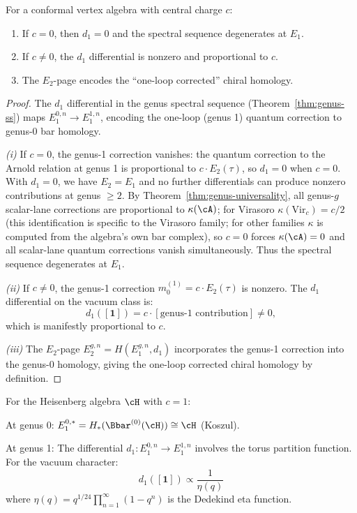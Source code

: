 \begin{proposition}
\label{prop:central-charge-d1}
For a conformal vertex algebra with central charge $c$:
\begin{enumerate}[label=(\roman*)]
\item If $c = 0$, then $d_1 = 0$ and the spectral sequence degenerates at $E_1$.
\item If $c \neq 0$, the $d_1$ differential is nonzero and proportional to $c$.
\item The $E_2$-page encodes the ``one-loop corrected'' chiral homology.
\end{enumerate}
\end{proposition}

\begin{proof}
The $d_1$ differential in the genus spectral sequence (Theorem~\ref{thm:genus-ss}) maps $E_1^{0,n} \to E_1^{1,n}$, encoding the one-loop (genus 1) quantum correction to genus-0 bar homology.

\emph{(i)} If $c = 0$, the genus-1 correction vanishes: the quantum correction to the Arnold relation at genus 1 is proportional to $c \cdot E_2(\tau)$, so $d_1 = 0$ when $c = 0$. With $d_1 = 0$, we have $E_2 = E_1$ and no further differentials can produce nonzero contributions at genus $\geq 2$. By Theorem~\ref{thm:genus-universality}, all genus-$g$ scalar-lane corrections are proportional to $\kappa(\cA)$; for Virasoro $\kappa(\mathrm{Vir}_c) = c/2$ (this identification is specific to the Virasoro family; for other families $\kappa$ is computed from the algebra's own bar complex), so $c = 0$ forces $\kappa(\cA) = 0$ and all scalar-lane quantum corrections vanish simultaneously. Thus the spectral sequence degenerates at $E_1$.

\emph{(ii)} If $c \neq 0$, the genus-1 correction $m_0^{(1)} = c \cdot E_2(\tau)$ is nonzero. The $d_1$ differential on the vacuum class is:
\[
d_1([\mathbf{1}]) = c \cdot [\text{genus-1 contribution}] \neq 0,
\]
which is manifestly proportional to $c$.

\emph{(iii)} The $E_2$-page $E_2^{g,n} = H(E_1^{g,n}, d_1)$ incorporates the genus-1 correction into the genus-0 homology, giving the one-loop corrected chiral homology by definition.
\end{proof}

\begin{example}
\label{ex:heisenberg-genus-ss}
For the Heisenberg algebra $\cH$ with $c = 1$:

At genus 0: $E_1^{0,*} = H_*(\Bbar^{(0)}(\cH)) \cong \cH$ (Koszul).

At genus 1: The differential $d_1: E_1^{0,n} \to E_1^{1,n}$ involves the torus
partition function. For the vacuum character:
\[
d_1([\mathbf{1}]) \propto \frac{1}{\eta(q)}
\]
where $\eta(q) = q^{1/24} \prod_{n=1}^\infty (1 - q^n)$ is the Dedekind eta function.
\end{example}

